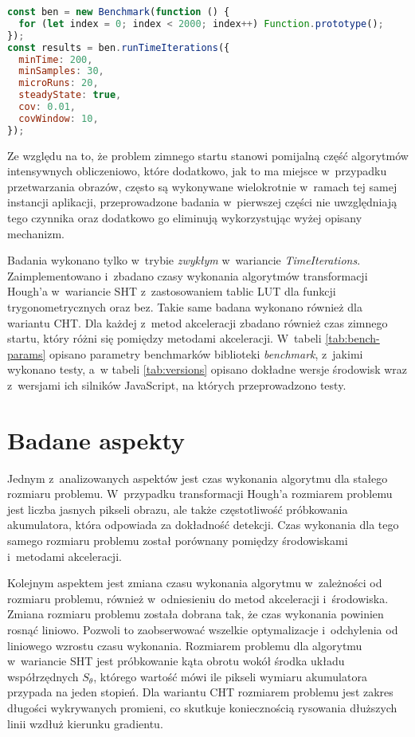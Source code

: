 \begin{lstlisting}[language=JavaScript, label=lst:benchmark-example, caption=Przykładowy benchmark mierzący czas wykonania funkcji \lstinline{Function.prototype()} 2000 razy.]
const ben = new Benchmark(function () {
  for (let index = 0; index < 2000; index++) Function.prototype();
});
const results = ben.runTimeIterations({
  minTime: 200,
  minSamples: 30,
  microRuns: 20,
  steadyState: true,
  cov: 0.01,
  covWindow: 10,
});
\end{lstlisting}


Ze względu na to, że problem zimnego startu stanowi pomijalną część algorytmów intensywnych obliczeniowo, które dodatkowo, jak to ma miejsce w~przypadku przetwarzania obrazów, często są wykonywane wielokrotnie w~ramach tej samej instancji aplikacji, przeprowadzone badania w~pierwszej części nie uwzględniają tego czynnika oraz dodatkowo go eliminują wykorzystując wyżej opisany mechanizm. 


Badania wykonano tylko w~trybie \textit{zwykłym} w~wariancie \textit{TimeIterations}. Zaimplementowano i~zbadano czasy wykonania algorytmów transformacji Hough'a w~wariancie SHT z~zastosowaniem tablic LUT dla funkcji trygonometrycznych oraz bez. Takie same badana wykonano również dla wariantu CHT. Dla każdej z~metod akceleracji zbadano również czas zimnego startu, który różni się pomiędzy metodami akceleracji. W~tabeli \ref{tab:bench-params} opisano parametry benchmarków biblioteki \textit{benchmark}, z~jakimi wykonano testy, a~w tabeli \ref{tab:versions} opisano dokładne wersje środowisk wraz z~wersjami ich silników JavaScript, na których przeprowadzono testy.



\section{Badane aspekty}

Jednym z~analizowanych aspektów jest czas wykonania algorytmu dla stałego rozmiaru problemu. W~przypadku transformacji Hough'a rozmiarem problemu jest liczba jasnych pikseli obrazu, ale także częstotliwość próbkowania akumulatora, która odpowiada za dokładność detekcji. Czas wykonania dla tego samego rozmiaru problemu został porównany pomiędzy środowiskami i~metodami akceleracji.

Kolejnym aspektem jest zmiana czasu wykonania algorytmu w~zależności od rozmiaru problemu, również w~odniesieniu do metod akceleracji i~środowiska. Zmiana rozmiaru problemu została dobrana tak, że czas wykonania powinien rosnąć liniowo. Pozwoli to zaobserwować wszelkie optymalizacje i~odchylenia od liniowego wzrostu czasu wykonania. Rozmiarem problemu dla algorytmu w~wariancie SHT jest próbkowanie kąta obrotu wokół środka układu współrzędnych $S_\theta$, którego wartość mówi ile pikseli wymiaru akumulatora przypada na jeden stopień. Dla wariantu CHT rozmiarem problemu jest zakres długości wykrywanych promieni, co skutkuje koniecznością rysowania dłuższych linii wzdłuż kierunku gradientu.

